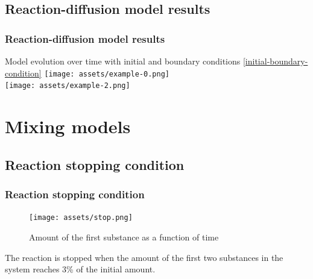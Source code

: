 \documentclass{beamer}
\begin{document}


\subsection{Reaction-diffusion model results}

\begin{frame}
  \frametitle{Reaction-diffusion model results}

  Model evolution over time with initial and boundary conditions \eqref{initial-boundary-condition}
  \centering
  \texttt{[image: assets/example-0.png]} \\ 
  \texttt{[image: assets/example-2.png]}

\end{frame}

\section{Mixing models}
\subsection{Reaction stopping condition}

\begin{frame}
  \frametitle{Reaction stopping condition}

  \centering
  \begin{figure}
    \texttt{[image: assets/stop.png]}
    \caption{Amount of the first substance as a function of time}
  \end{figure}

  The reaction is stopped when the amount of the first two substances in the system reaches 3\% of the initial amount.

\end{frame}
\end{document}
